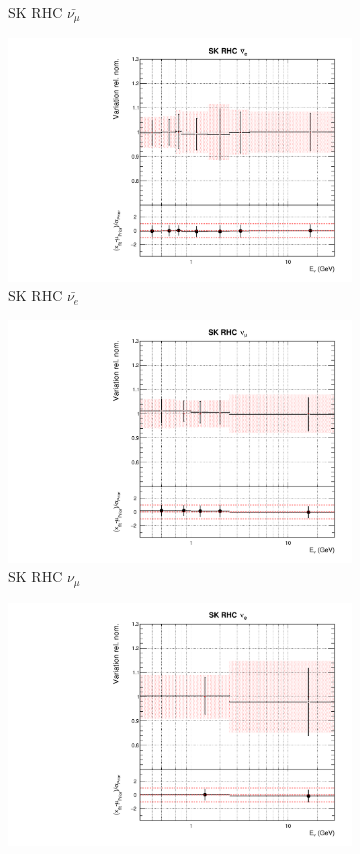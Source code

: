 \begin{figure}
\begin{subfigure}{0.24\textwidth}
  \caption{SK RHC $\bar{\nu_{\mu}}$}
\end{subfigure}
\begin{subfigure}{0.24\textwidth}
  \centering
  \includegraphics[width=0.95\linewidth]{figs/asmvflux13}
  \caption{SK RHC $\bar{\nu_e}$}
\end{subfigure}
\begin{subfigure}{0.24\textwidth}
  \centering
  \includegraphics[width=0.95\linewidth]{figs/asmvflux14}
  \caption{SK RHC $\nu_{\mu}$}
\end{subfigure}
\begin{subfigure}{0.24\textwidth}
  \centering
  \includegraphics[width=0.95\linewidth]{figs/asmvflux15}

\end{subfigure}
\end{figure}
